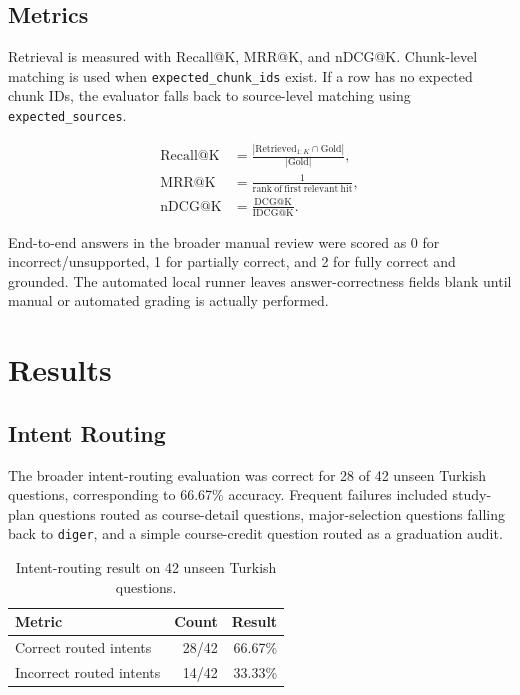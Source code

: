 \documentclass[10pt,a4paper]{article}
\newcommand{\code}[1]{\texttt{\small #1}}
\begin{document}
\subsection{Metrics}

Retrieval is measured with Recall@K, MRR@K, and nDCG@K. Chunk-level matching is used when \code{expected\_chunk\_ids} exist. If a row has no expected chunk IDs, the evaluator falls back to source-level matching using \code{expected\_sources}.

\begin{align}
\mathrm{Recall@K} &= \frac{|\mathrm{Retrieved}_{1:K} \cap \mathrm{Gold}|}{|\mathrm{Gold}|},\\
\mathrm{MRR@K} &= \frac{1}{\mathrm{rank\ of\ first\ relevant\ hit}},\\
\mathrm{nDCG@K} &= \frac{\mathrm{DCG@K}}{\mathrm{IDCG@K}}.
\end{align}

End-to-end answers in the broader manual review were scored as 0 for incorrect/unsupported, 1 for partially correct, and 2 for fully correct and grounded. The automated local runner leaves answer-correctness fields blank until manual or automated grading is actually performed.

\section{Results}

\subsection{Intent Routing}

The broader intent-routing evaluation was correct for 28 of 42 unseen Turkish questions, corresponding to 66.67\% accuracy. Frequent failures included study-plan questions routed as course-detail questions, major-selection questions falling back to \code{diger}, and a simple course-credit question routed as a graduation audit.

\begin{table}[H]
\centering
\caption{Intent-routing result on 42 unseen Turkish questions.}
\small
\begin{tabular}{lrr}
\toprule
\textbf{Metric} & \textbf{Count} & \textbf{Result}\\
\midrule
Correct routed intents & 28/42 & 66.67\%\\
Incorrect routed intents & 14/42 & 33.33\%\\
\bottomrule
\end{tabular}
\end{table}
\end{document}
